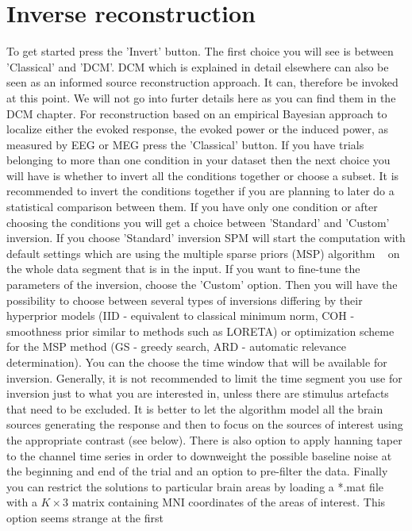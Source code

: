 \section{Inverse reconstruction}
To get started press the 'Invert' button. The first
choice you will see is between 'Classical' and 'DCM'. DCM which is explained in detail elsewhere can also be seen as an 
informed source reconstruction approach. It can, therefore be invoked at this point. We will not go into furter details here as you
can find them in the DCM chapter. For reconstruction based on an empirical Bayesian approach to localize either the evoked response, 
the evoked power or the induced power, as measured by EEG or MEG press the 'Classical' button. If you have trials belonging to more than one condition
in your dataset then the next choice you will have is whether to invert all the conditions together or choose a subset. It is recommended to invert
the conditions together if you are planning to later do a statistical comparison between them. If you have only one condition or after choosing
the conditions you will get a choice between 'Standard' and 'Custom' inversion. If you choose 'Standard' inversion SPM will start the computation
with default settings which are using the multiple sparse priors (MSP) algorithm ~\cite{karl_msp} on the whole data segment that is in the input.
If you want to fine-tune the parameters of the inversion, choose the 'Custom' option.
Then you will have the possibility to choose between several types of inversions differing by their hyperprior models (IID - equivalent to classical
minimum norm, COH - smoothness prior similar to methods such as LORETA) or optimization scheme for the MSP method (GS - greedy search, ARD - automatic
relevance determination). You can the choose the time window that will be available for inversion. Generally, it is not recommended to limit the time
segment you use for inversion just to what you are interested in, unless there are stimulus artefacts
that need to be excluded. It is better to let the algorithm model all the brain sources generating the response and then to focus on the sources
of interest using the appropriate contrast (see below). There is also option to apply hanning taper to the channel time series in order to downweight
the possible baseline noise at the beginning and end of the trial and an option to pre-filter the data. Finally you can restrict the solutions to particular
brain areas by loading a *.mat file with a $K \times 3$ matrix containing MNI coordinates of the areas of interest. This option seems strange at the first
